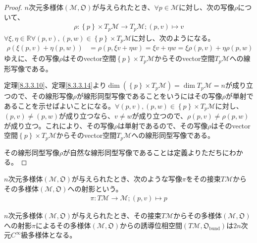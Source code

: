 \documentclass[dvipdfmx]{jsarticle}
\begin{document}
\begin{proof}
  $n$次元多様体$\left(\mathcal{M},\mathfrak{O}\right)$が与えられたとき、$\forall p\in \mathcal{M}$に対し、次の写像$\rho $について、
  \begin{align*}
    \rho : \left\{ p\right\} \times T_p \mathcal{M} \rightarrow T_p \mathcal{M} ;\left(p,v\right) \mapsto v
  \end{align*}
  $\forall \xi ,\eta \in \mathbb{R} \forall \left(p,v\right),\left(p,w\right) \in \left\{ p\right\} \times T_p \mathcal{M}$に対し、次のようになる。
  \begin{align*}
    \rho \left(\xi \left(p,v\right) +\eta \left(p,w\right)\right) &= \rho \left(p,\xi v+\eta w\right) =\xi v+\eta w =\xi \rho \left(p,v\right)+\eta \rho \left(p,w\right)
  \end{align*}
  ゆえに、その写像$\rho $はそのvector空間$\left\{ p\right\} \times T_p \mathcal{M}$からそのvector空間$T_p \mathcal{M}$への線形写像である。\par
  定理\ref{8.3.3.10}、定理\ref{8.3.3.14}より$\dim \left(\left\{ p\right\} \times T_p \mathcal{M} \right) =\dim T_p \mathcal{M} =n$が成り立つので、その線形写像$\rho $が線形同型写像であることをいうにはその写像$\rho $が単射であることを示せばよいことになる。$\forall \left(p,v\right),\left(p,w\right)\in \left\{ p\right\} \times T_p \mathcal{M} $に対し、$\left(p,v\right)\ne \left(p,w\right)$が成り立つなら、$v\ne w$が成り立つので、$\rho \left(p,v\right) \ne \rho \left(p,w\right)$が成り立つ。これにより、その写像$\rho $は単射であるので、その写像$\rho $はそのvector空間$\left\{ p\right\} \times T_p \mathcal{M}$からそのvector空間$T_p \mathcal{M}$への線形同型写像である。\par
  その線形同型写像$\rho $が自然な線形同型写像であることは定義よりただちにわかる。
\end{proof}
\begin{dfn}
  $n$次元多様体$\left(\mathcal{M},\mathfrak{O}\right)$が与えられたとき、次のような写像$\pi $をその接束$T\mathcal{M}$からその多様体$\left(\mathcal{M},\mathfrak{O}\right)$への射影という。
  \begin{align*}
    \pi :T\mathcal{M} \rightarrow \mathcal{M} ;\left(p,v\right) \mapsto p
  \end{align*}
\end{dfn}
\begin{thm}\label{8.3.3.16}
  $n$次元多様体$\left(\mathcal{M},\mathfrak{O}\right)$が与えられたとき、その接束$T\mathcal{M}$からその多様体$\left(\mathcal{M},\mathfrak{O}\right)$への射影$\pi $によるその多様体$\left(\mathcal{M},\mathfrak{O}\right)$からの誘導位相空間$\left(T\mathcal{M},\mathfrak{O}_\mathrm{bund}\right)$は$2n$次元$C^\infty $級多様体となる。
\end{thm}
\end{document}
